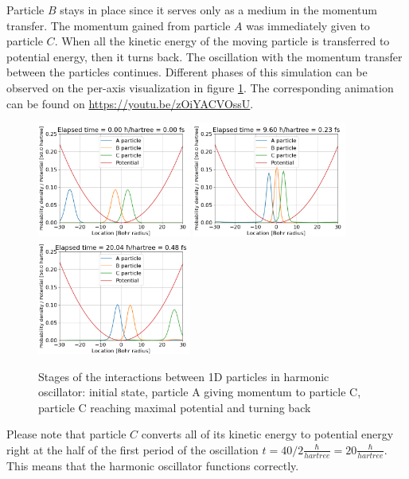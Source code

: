 Particle $B$ stays in place since it serves only as a medium in the momentum transfer.
The momentum gained from particle $A$ was immediately given to particle $C$.
When all the kinetic energy of the moving particle is transferred to potential energy, then it turns back.
The oscillation with the momentum transfer between the particles continues.
Different phases of this simulation can be observed on the per-axis visualization in figure \ref{fig:1d_particles_in_oscillator_stages}.
The corresponding animation can be found on \url{https://youtu.be/zOiYACVOssU}.
\begin{figure}[hbt!]
	\begin{center}
		\includegraphics[width=0.45\textwidth]{figures/1d_oscillator_01.png}
		\includegraphics[width=0.45\textwidth]{figures/1d_oscillator_02.png}
		\includegraphics[width=0.45\textwidth]{figures/1d_oscillator_03.png}
		\caption{Stages of the interactions between 1D particles in harmonic oscillator: initial state, particle A giving momentum to particle C, particle C reaching maximal potential and turning back}
		\label{fig:1d_particles_in_oscillator_stages}
	\end{center}
\end{figure}
Please note that particle $C$ converts all of its kinetic energy to potential energy right at the half of the first period of the oscillation $t = 40 / 2 \frac{\hbar}{hartree} = 20 \frac{\hbar}{hartree}$.
This means that the harmonic oscillator functions correctly.

